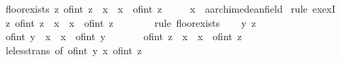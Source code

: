 \begin{isabellebody}
\isanewline
{}\isamarkupfalse%
%
\endisatagproof
{\isafoldproof}%
%
\isadelimproof
\isanewline
%
\endisadelimproof
\isanewline
{}\isamarkupfalse%
\ floor{\isacharunderscore}{\kern0pt}exists{}{\isacharcolon}{\kern0pt}\ {\isachardoublequoteopen}{\isasymexists}{\isacharbang}{\kern0pt}z{\isachardot}{\kern0pt}\ of{\isacharunderscore}{\kern0pt}int\ z\ {\isasymle}\ x\ {\isasymand}\ x\ {\isacharless}{\kern0pt}\ of{\isacharunderscore}{\kern0pt}int\ {\isacharparenleft}{\kern0pt}z\ {\isacharplus}{\kern0pt}\ {}{\isacharparenright}{\kern0pt}{\isachardoublequoteclose}\isanewline
\ \ \ x\ {\isacharcolon}{\kern0pt}{\isacharcolon}{\kern0pt}\ {\isachardoublequoteopen}{\isacharprime}{\kern0pt}a{\isacharcolon}{\kern0pt}{\isacharcolon}{\kern0pt}archimedean{\isacharunderscore}{\kern0pt}field{\isachardoublequoteclose}\isanewline
%
\isadelimproof
%
\endisadelimproof
%
\isatagproof
{}\isamarkupfalse%
\ {\isacharparenleft}{\kern0pt}rule\ ex{\isacharunderscore}{\kern0pt}ex{}I{\isacharparenright}{\kern0pt}\isanewline
\ \ \isamarkupfalse%
\ {\isachardoublequoteopen}{\isasymexists}z{\isachardot}{\kern0pt}\ of{\isacharunderscore}{\kern0pt}int\ z\ {\isasymle}\ x\ {\isasymand}\ x\ {\isacharless}{\kern0pt}\ of{\isacharunderscore}{\kern0pt}int\ {\isacharparenleft}{\kern0pt}z\ {\isacharplus}{\kern0pt}\ {}{\isacharparenright}{\kern0pt}{\isachardoublequoteclose}\isanewline
\ \ \ \ \isamarkupfalse%
\ {\isacharparenleft}{\kern0pt}rule\ floor{\isacharunderscore}{\kern0pt}exists{\isacharparenright}{\kern0pt}\isanewline
{}\isamarkupfalse%
\isanewline
\ \ \isamarkupfalse%
\ y\ z\isanewline
\ \ \isamarkupfalse%
\ {\isachardoublequoteopen}of{\isacharunderscore}{\kern0pt}int\ y\ {\isasymle}\ x\ {\isasymand}\ x\ {\isacharless}{\kern0pt}\ of{\isacharunderscore}{\kern0pt}int\ {\isacharparenleft}{\kern0pt}y\ {\isacharplus}{\kern0pt}\ {}{\isacharparenright}{\kern0pt}{\isachardoublequoteclose}\isanewline
\ \ \ \ \ {\isachardoublequoteopen}of{\isacharunderscore}{\kern0pt}int\ z\ {\isasymle}\ x\ {\isasymand}\ x\ {\isacharless}{\kern0pt}\ of{\isacharunderscore}{\kern0pt}int\ {\isacharparenleft}{\kern0pt}z\ {\isacharplus}{\kern0pt}\ {}{\isacharparenright}{\kern0pt}{\isachardoublequoteclose}\isanewline
\ \ \isamarkupfalse%
\ le{\isacharunderscore}{\kern0pt}less{\isacharunderscore}{\kern0pt}trans\ {\isacharbrackleft}{\kern0pt}of\ {\isachardoublequoteopen}of{\isacharunderscore}{\kern0pt}int\ y{\isachardoublequoteclose}\ {\isachardoublequoteopen}x{\isachardoublequoteclose}\ {\isachardoublequoteopen}of{\isacharunderscore}{\kern0pt}int\ {\isacharparenleft}{\kern0pt}z\ {\isacharplus}{\kern0pt}\ {}{\isacharparenright}{\kern0pt}{\isachardoublequoteclose}{\isacharbrackright}{\kern0pt}\isanewline

\end{isabellebody}
